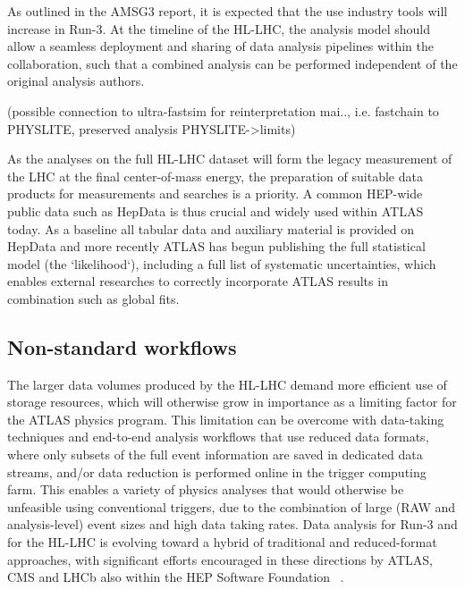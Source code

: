 As outlined in the AMSG3 report, it is expected that the use industry tools will increase in Run-3. At the timeline of the HL-LHC, the analysis model should allow a seamless deployment and sharing of data analysis pipelines within the collaboration, such that a combined analysis can be performed independent of the original analysis authors.

(possible connection to ultra-fastsim for reinterpretation mai.., i.e. fastchain to PHYSLITE, preserved analysis PHYSLITE->limits)

As the analyses on the full HL-LHC dataset will form the legacy measurement of the LHC at the final center-of-mass energy, the preparation of suitable data products for measurements and searches is a priority. A common HEP-wide public data such as HepData is thus crucial and widely used within ATLAS today. As a baseline all tabular data and auxiliary material is provided on HepData and more recently ATLAS has begun publishing the full statistical model (the `likelihood`), including a full list of systematic uncertainties, which enables external researches to correctly incorporate ATLAS results in combination such as global fits.

\subsection{Non-standard workflows}


The larger data volumes produced by the HL-LHC demand more efficient use of storage resources, which will otherwise grow in importance as a limiting factor for the ATLAS physics program.
This limitation can be overcome with data-taking techniques and end-to-end analysis workflows that use reduced data formats, where only subsets of the full event information are saved in dedicated data streams, and/or data reduction is performed online in the trigger computing farm.
This enables a variety of physics analyses that would otherwise be unfeasible using conventional triggers, due to the combination of large (RAW and analysis-level) event sizes and high data taking rates.
Data analysis for Run-3 and for the HL-LHC is evolving toward a hybrid of traditional and reduced-format approaches, with significant efforts encouraged in these directions by ATLAS, CMS and LHCb also within the HEP Software Foundation ~\cite{Alves:2017she,albrecht2018hepexec,albrecht2018hep}.

